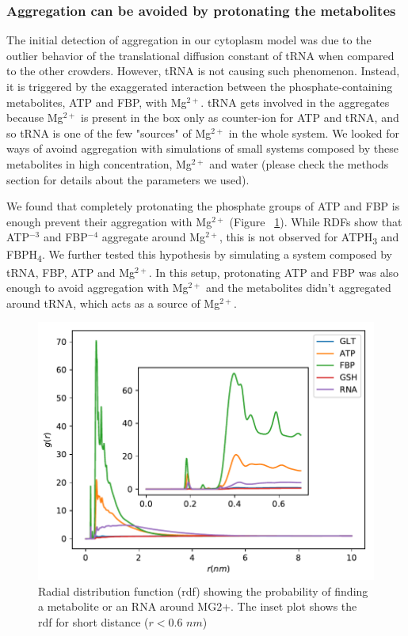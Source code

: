 \documentclass[journal=jacsat,manuscript=article]{achemso}
\begin{document}

\subsubsection{Aggregation can be avoided by protonating the metabolites}

The initial detection of aggregation in our cytoplasm model was due to the outlier behavior of the translational diffusion constant of tRNA when compared to the other crowders. However, tRNA is not causing such phenomenon. Instead, it is triggered by the exaggerated interaction between the phosphate-containing metabolites, ATP and FBP, with Mg$^{2+}$. tRNA gets involved in the aggregates because Mg$^{2+}$ is present in the box only as counter-ion for ATP and tRNA, and so tRNA is one of the few "sources" of Mg$^{2+}$ in the whole system. We looked for ways of avoind aggregation with simulations of small systems composed by these metabolites in high concentration, Mg$^{2+}$ and water (please check the methods section for details about the parameters we used).

We found that completely protonating the phosphate groups of ATP and FBP is enough prevent their aggregation with Mg$^{2+}$ (Figure ~\ref{fig:avoiding_aggregation}). While RDFs show that ATP$^{-3}$ and FBP$^{-4}$ aggregate around Mg$^{2+}$, this is not observed for ATPH\textsubscript{3} and FBPH\textsubscript{4}. \colorbox{red!50}{We further tested this hypothesis by simulating a system composed by tRNA, FBP, ATP and Mg$^{2+}$. In this setup, protonating ATP and FBP was also enough to avoid aggregation with Mg$^{2+}$ and the metabolites didn't aggregated around tRNA, which acts as a source of Mg$^{2+}$.}

\begin{figure}[H]
\includegraphics[scale=0.5]{rdf_mg.pdf}
\caption{Radial distribution function (rdf) showing the probability of finding a metabolite or an RNA around MG2+. The inset plot shows the rdf for short distance ($ r < 0.6 \,\, nm$)}
\label{fig:avoiding_aggregation}
\end{figure}
\end{document}
